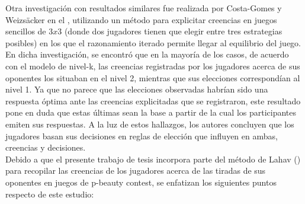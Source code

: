 Otra investigación con resultados similares fue realizada por Costa-Gomes y Weizsäcker en el \citeyear{Costa-Gomes}, utilizando un método para explicitar creencias en juegos sencillos de $3x3$ (donde dos jugadores tienen que elegir entre tres estrategias posibles) en los que el razonamiento iterado permite llegar al equilibrio del juego. En dicha investigación, se encontró que en la mayoría de los casos, de acuerdo con el modelo de nivel-k, las creencias registradas por los jugadores acerca de sus oponentes los situaban en el nivel 2, mientras que sus elecciones correspondían al nivel 1. Ya que no parece que las elecciones observadas habrían sido una respuesta óptima ante las creencias explicitadas que se registraron, este resultado pone en duda que estas últimas sean la base a partir de la cual los participantes emiten sus respuestas. A la luz de estos hallazgos, los autores concluyen que los jugadores basan sus decisiones en reglas de elección que influyen en ambas, creencias y decisiones.\\

Debido a que el presente trabajo de tesis incorpora parte del método de Lahav (\citeyear{Lahav}) para recopilar las creencias de los jugadores acerca de las tiradas de sus oponentes en juegos de p-beauty contest, se enfatizan los siguientes puntos respecto de este estudio: \\

